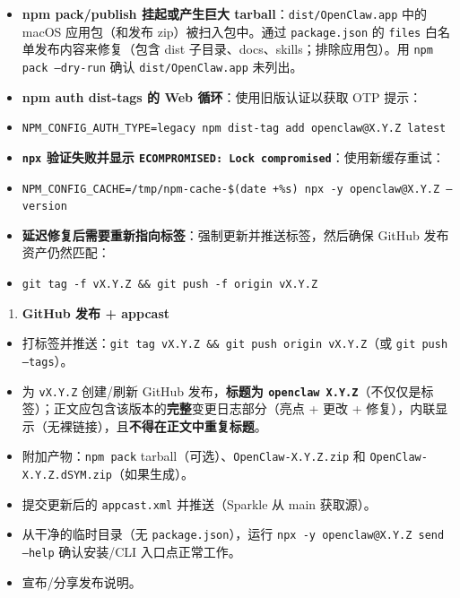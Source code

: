 \begin{itemize}
  \item \textbf{npm pack/publish 挂起或产生巨大 tarball}：\texttt{dist/OpenClaw.app} 中的 macOS 应用包（和发布 zip）被扫入包中。通过 \texttt{package.json} 的 \texttt{files} 白名单发布内容来修复（包含 dist 子目录、docs、skills；排除应用包）。用 \texttt{npm pack --dry-run} 确认 \texttt{dist/OpenClaw.app} 未列出。
  \item \textbf{npm auth dist-tags 的 Web 循环}：使用旧版认证以获取 OTP 提示：
  \item \texttt{NPM\_CONFIG\_AUTH\_TYPE=legacy npm dist-tag add openclaw@X.Y.Z latest}
  \item \textbf{\texttt{npx} 验证失败并显示 \texttt{ECOMPROMISED: Lock compromised}}：使用新缓存重试：
  \item \texttt{NPM\_CONFIG\_CACHE=/tmp/npm-cache-\$(date +\%s) npx -y openclaw@X.Y.Z --version}
  \item \textbf{延迟修复后需要重新指向标签}：强制更新并推送标签，然后确保 GitHub 发布资产仍然匹配：
  \item \texttt{git tag -f vX.Y.Z \&\& git push -f origin vX.Y.Z}
\end{itemize}


\begin{enumerate}
  \item \textbf{GitHub 发布 + appcast}
\end{enumerate}


\begin{itemize}
  \item [ ] 打标签并推送：\texttt{git tag vX.Y.Z \&\& git push origin vX.Y.Z}（或 \texttt{git push --tags}）。
  \item [ ] 为 \texttt{vX.Y.Z} 创建/刷新 GitHub 发布，\textbf{标题为 \texttt{openclaw X.Y.Z}}（不仅仅是标签）；正文应包含该版本的\textbf{完整}变更日志部分（亮点 + 更改 + 修复），内联显示（无裸链接），且\textbf{不得在正文中重复标题}。
  \item [ ] 附加产物：\texttt{npm pack} tarball（可选）、\texttt{OpenClaw-X.Y.Z.zip} 和 \texttt{OpenClaw-X.Y.Z.dSYM.zip}（如果生成）。
  \item [ ] 提交更新后的 \texttt{appcast.xml} 并推送（Sparkle 从 main 获取源）。
  \item [ ] 从干净的临时目录（无 \texttt{package.json}），运行 \texttt{npx -y openclaw@X.Y.Z send --help} 确认安装/CLI 入口点正常工作。
  \item [ ] 宣布/分享发布说明。
\end{itemize}


